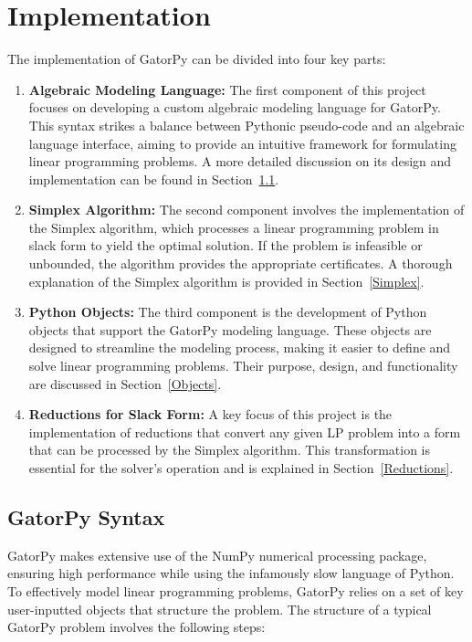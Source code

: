\documentclass[conference]{IEEEtran}
\begin{document}
\section{Implementation}
\label{sse:implementation}
The implementation of GatorPy can be divided into four key parts:

\begin{enumerate}
    \item \textbf{Algebraic Modeling Language:} The first component of this project focuses on developing a custom algebraic modeling language for GatorPy. 
    This syntax strikes a balance between Pythonic pseudo-code and an algebraic language interface, aiming to provide an intuitive framework for formulating linear programming problems. 
    A more detailed discussion on its design and implementation can be found in Section~\ref{Syntax}.
    
    \item \textbf{Simplex Algorithm:} The second component involves the implementation of the Simplex algorithm, which processes a linear programming problem in slack form to yield the optimal solution. 
    If the problem is infeasible or unbounded, the algorithm provides the appropriate certificates. 
    A thorough explanation of the Simplex algorithm is provided in Section~\ref{Simplex}.
    
    \item \textbf{Python Objects:} The third component is the development of Python objects that support the GatorPy modeling language. 
    These objects are designed to streamline the modeling process, making it easier to define and solve linear programming problems. 
    Their purpose, design, and functionality are discussed in Section~\ref{Objects}.
    
    \item \textbf{Reductions for Slack Form:} A key focus of this project is the implementation of reductions that convert any given LP problem into a form that can be processed by the Simplex algorithm. 
    This transformation is essential for the solver's operation and is explained in Section~\ref{Reductions}.
\end{enumerate}
\subsection{GatorPy Syntax}
\label{Syntax}
GatorPy makes extensive use of the NumPy numerical processing package, ensuring high performance while using the infamously slow language of Python. 
To effectively model linear programming problems, GatorPy relies on a set of key user-inputted objects that structure the problem.
The structure of a typical GatorPy problem involves the following steps:
\end{document}
